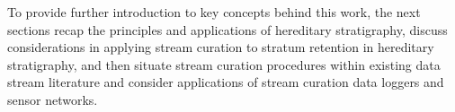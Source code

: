 To provide further introduction to key concepts behind this work, the next sections recap the principles and applications of hereditary stratigraphy, discuss considerations in applying stream curation to stratum retention in hereditary stratigraphy, and then situate stream curation procedures within existing data stream literature and consider applications of stream curation data loggers and sensor networks.
